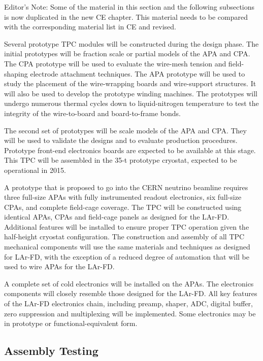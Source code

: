 \begin{editornote}
  Editor's Note:  Some of the material in this section and the following subsections is now duplicated in the new CE chapter.
  This material needs to be compared with the corresponding material list in CE and revised.
\end{editornote}

Several prototype TPC modules will be constructed during the 
design phase.  The initial prototypes will be fraction scale or 
partial models of the APA and CPA.  The CPA prototype will be used 
to evaluate the wire-mesh tension and field-shaping electrode 
attachment techniques.   The APA prototype will be used to study 
the placement of the wire-wrapping boards and wire-support structures.  
It will also be used to develop the prototype winding machines.  
The prototypes will undergo numerous thermal cycles down to 
liquid-nitrogen temperature to test the integrity of the wire-to-board
and board-to-frame bonds.

The second set of prototypes will be scale models of the 
APA and CPA.  They will be used to validate the designs and 
to evaluate production procedures.  Prototype front-end electronics 
boards are expected to be available at this stage.  This TPC will be assembled in the 35-t prototype cryostat, expected to be operational in 2015.

A prototype that is proposed to go into the CERN neutrino beamline requires three full-size APAs with fully instrumented readout electronics, six full-size CPAs, and complete field-cage coverage.  The TPC will be constructed using identical APAs, CPAs and field-cage panels as designed for the LAr-FD.  Additional features will be installed to ensure proper TPC operation given the half-height cryostat configuration. The construction and assembly of all TPC mechanical components will use the same materials and techniques as designed for LAr-FD, with the exception of a reduced degree of automation that will be used to wire APAs for the LAr-FD.

A complete set of cold electronics will be installed on the APAs.  The electronics components will closely resemble those designed for the LAr-FD. All key features of the LAr-FD electronics chain, including preamp, shaper, ADC, digital buffer, zero suppression and multiplexing will be implemented.  Some  electronics  may be in prototype or functional-equivalent form.

\subsection{Assembly Testing}
\label{sec:v5-tpc-checkout-test}

